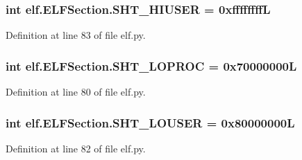 \subsubsection[{\texorpdfstring{S\+H\+T\+\_\+\+H\+I\+U\+S\+ER}{SHT_HIUSER}}]{\setlength{\rightskip}{0pt plus 5cm}int elf.\+E\+L\+F\+Section.\+S\+H\+T\+\_\+\+H\+I\+U\+S\+ER = 0xffffffffL\hspace{0.3cm}{\ttfamily [static]}}\hypertarget{clasself_1_1_e_l_f_section_a315e7a1fb27d3658cccd77568befea8a}{}\label{clasself_1_1_e_l_f_section_a315e7a1fb27d3658cccd77568befea8a}


Definition at line 83 of file elf.\+py.

\subsubsection[{\texorpdfstring{S\+H\+T\+\_\+\+L\+O\+P\+R\+OC}{SHT_LOPROC}}]{\setlength{\rightskip}{0pt plus 5cm}int elf.\+E\+L\+F\+Section.\+S\+H\+T\+\_\+\+L\+O\+P\+R\+OC = 0x70000000L\hspace{0.3cm}{\ttfamily [static]}}\hypertarget{clasself_1_1_e_l_f_section_a1a4d4e72afdccb156e6e5333bb4c7922}{}\label{clasself_1_1_e_l_f_section_a1a4d4e72afdccb156e6e5333bb4c7922}


Definition at line 80 of file elf.\+py.

\subsubsection[{\texorpdfstring{S\+H\+T\+\_\+\+L\+O\+U\+S\+ER}{SHT_LOUSER}}]{\setlength{\rightskip}{0pt plus 5cm}int elf.\+E\+L\+F\+Section.\+S\+H\+T\+\_\+\+L\+O\+U\+S\+ER = 0x80000000L\hspace{0.3cm}{\ttfamily [static]}}\hypertarget{clasself_1_1_e_l_f_section_a71552f7d240349dd63da0f78fdacc8fc}{}\label{clasself_1_1_e_l_f_section_a71552f7d240349dd63da0f78fdacc8fc}


Definition at line 82 of file elf.\+py.

